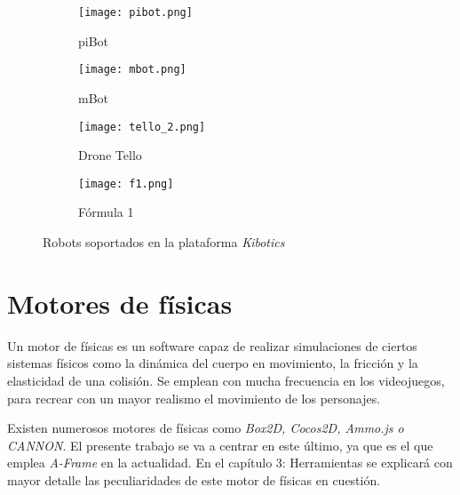 \begin{figure}[h!]
  \begin{subfigure}[b]{0.2\textwidth}
    \texttt{[image: pibot.png]}
    \caption{piBot}
  \end{subfigure}
  \hfill
  \begin{subfigure}[b]{0.2\textwidth}
    \texttt{[image: mbot.png]}
    \caption{mBot}
  \end{subfigure}
    \hfill
  \begin{subfigure}[b]{0.2\textwidth}
    \texttt{[image: tello\_2.png]}
    \caption{Drone Tello}
  \end{subfigure}
    \hfill
  \begin{subfigure}[b]{0.2\textwidth}
    \texttt{[image: f1.png]}
    \caption{Fórmula 1}
  \end{subfigure}
\caption{Robots soportados en la plataforma \textit{Kibotics}}
\label{fig:RobotsKibotics}
\end{figure}


\section{Motores de físicas}
Un motor de físicas es un software capaz de realizar simulaciones de ciertos sistemas físicos como la dinámica del cuerpo en movimiento, la fricción y la elasticidad de una colisión. Se emplean con mucha frecuencia en los videojuegos, para recrear con un mayor realismo el movimiento de los personajes. \newline

Existen numerosos motores de físicas como \textit{Box2D, Cocos2D, Ammo.js o CANNON}. El presente trabajo se va a centrar en este último, ya que es el que emplea \textit{A-Frame} en la actualidad. En el capítulo 3: Herramientas se explicará con mayor detalle las peculiaridades de este motor de físicas en cuestión. \newline

